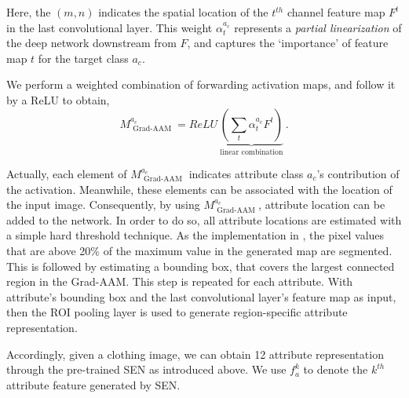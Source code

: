 \documentclass{article}
\begin{document}
Here, the $(m,n)$ indicates the spatial location of the $t^{th}$ channel feature map $F ^ { t }$ in the last convolutional layer. This weight $\alpha _ { t } ^ { a_c }$ represents a \textit{partial linearization} of the deep network downstream from $F$, and captures the `importance' of feature map $t$ for the target class $a_c$.

We perform a weighted combination of forwarding activation maps, and follow it by a ReLU to obtain,
\begin{equation}
    M _ { \text { Grad-AAM } } ^ { a_c } =  ReLU \underbrace { \left( \sum _ { t } \alpha _ { t } ^ { a_c } F ^ { t }  \right) } _ { \text { linear combination } }.
\label{equation:grad-aam}
\end{equation}

Actually, each element of $M _ { \text { Grad-AAM } } ^ { a_c }$ indicates attribute class ${ a_c }$'s contribution of the activation. Meanwhile, these elements can be associated with the location of the input image. Consequently, by using $M _ { \text { Grad-AAM } } ^ { a_c }$, attribute location can be added to the network. In order to do so, all attribute locations are estimated with a simple hard threshold technique. As the implementation in \cite{ak2018learning}, the pixel values that are above 20\% of the maximum value in the generated map are segmented. This is followed by estimating a bounding box, that covers the largest connected region in the Grad-AAM. This step is repeated for each attribute. With attribute's bounding box and the last convolutional layer's feature map as input, then the ROI pooling layer \cite{girshick2015fast} is used to generate region-specific attribute representation. 

Accordingly, given a clothing image, we can obtain 12 attribute representation through the pre-trained SEN as introduced above. We use $f_a^k$ to denote the $k ^ {t h}$ attribute feature generated by SEN.
\end{document}
